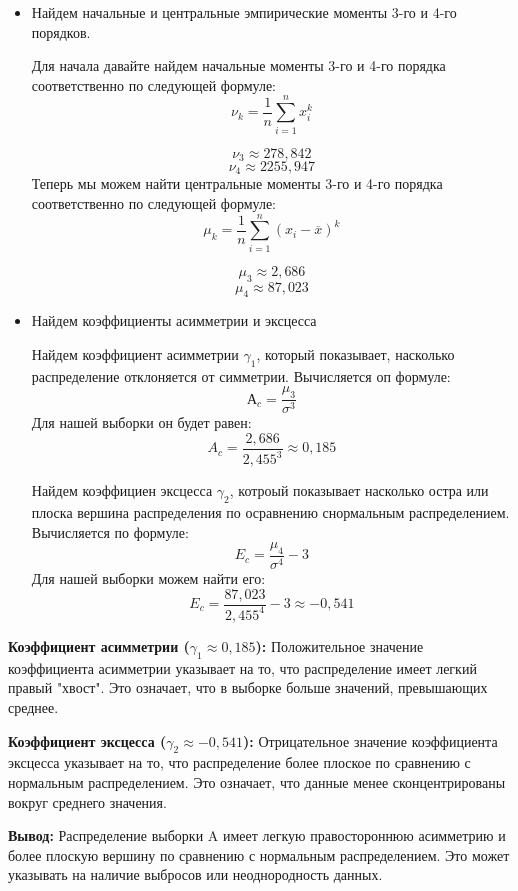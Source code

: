 \documentclass[12pt]{article}
\begin{document}
\begin{itemize}
\item Найдем начальные и центральные эмпирические моменты 3-го и 4-го порядков.

Для начала давайте найдем начальные моменты 3-го и 4-го порядка соответственно по следующей формуле:\\
$$ \nu_k = \frac{1}{n} \sum_{i=1} ^ n x_i ^k$$

$$ \nu_3 \approx 278,842 $$
$$ \nu_4 \approx 2255,947 $$
\newpage
Теперь мы можем найти центральные моменты 3-го и 4-го порядка соответственно по следующей формуле:\\
$$ \mu_k = \frac{1}{n} \sum_{i=1} ^ n {(x_i - \overline{x})^k} $$

$$ \mu_3 \approx 2,686 $$
$$ \mu_4 \approx 87,023 $$

\item Найдем коэффициенты асимметрии и эксцесса

Найдем коэффициент асимметрии $\gamma_1$, который показывает, насколько распределение отклоняется от симметрии. Вычисляется оп формуле:\\
$$ А_c = \frac{\mu_3}{\sigma^3} $$
Для нашей выборки он будет равен:
$$ A_c = \frac{2,686}{2,455^3} \approx 0,185$$

Найдем коэффициен эксцесса $\gamma_2$, котроый показывает насколько остра или плоска вершина распределения по осравнению снормальным распределением. Вычисляется по формуле:\\
$$ E_c = \frac{\mu_4}{\sigma^4} - 3 $$
Для нашей выборки можем найти его:\\
$$ E_c = \frac{87,023}{2,455^4} - 3 \approx -0,541 $$

\end{itemize}

\textbf{Коэффициент асимметрии ($\gamma_1 \approx 0,185$):}
Положительное значение коэффициента асимметрии указывает на то, что распределение имеет легкий правый "хвост". Это означает, что в выборке больше значений, превышающих среднее.

\textbf{Коэффициент эксцесса ($\gamma_2 \approx -0,541$):}
Отрицательное значение коэффициента эксцесса указывает на то, что распределение более плоское по сравнению с нормальным распределением. Это означает, что данные менее сконцентрированы вокруг среднего значения.

\textbf{Вывод:} Распределение выборки A имеет легкую правостороннюю асимметрию и более плоскую вершину по сравнению с нормальным распределением. Это может указывать на наличие выбросов или неоднородность данных.
\end{document}
